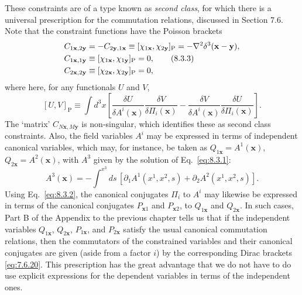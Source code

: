 These constraints are of a type known as \textit{second class}, for which
there is a universal prescription for the commutation relations, discussed
in Section 7.6. Note that the constraint functions have the Poisson brackets
\begin{align}
  C_{1\mathbf x,2\mathbf y}
  &=-C_{2\mathbf y,1\mathbf x}
  \equiv[\chi_{1\mathbf x},\chi_{2\mathbf y}]_{\mathrm P}
  =-\nabla^2\delta^3(\mathbf x-\mathbf y),
  \notag\\
  C_{1\mathbf x,1\mathbf y}
  &\equiv[\chi_{1\mathbf x},\chi_{1\mathbf y}]_{\mathrm P}=0,
  \tag{8.3.3}\label{eq:8.3.3}\\
  C_{2\mathbf x,2\mathbf y}
  &\equiv[\chi_{2\mathbf x},\chi_{2\mathbf y}]_{\mathrm P}=0,
  \notag
\end{align}
where here, for any functionals $U$ and $V$,
\[
  [U,V]_{\mathrm P}\equiv\int d^3x\left[
  \frac{\delta U}{\delta A^i(\mathbf x)}
  \frac{\delta V}{\delta\Pi_i(\mathbf x)}
  -\frac{\delta V}{\delta A^i(\mathbf x)}
  \frac{\delta U}{\delta\Pi_i(\mathbf x)}\right].
\]
The `matrix' $C_{N\mathbf x,M\mathbf y}$ is non-singular, which identifies
these as second class constraints. Also, the field variables $A^i$ may be
expressed in terms of independent canonical variables, which may, for
instance, be taken as $Q_{1\mathbf x}=A^1(\mathbf x)$,
$Q_{2\mathbf x}=A^2(\mathbf x)$, with $A^3$ given by the solution of
Eq.~\eqref{eq:8.3.1}:
\[
  A^3(\mathbf x)=-\int^{x^3}ds\,
  [\partial_1A^1(x^1,x^2,s)+\partial_2A^2(x^1,x^2,s)].
\]
Using Eq.~\eqref{eq:8.3.2}, the canonical conjugates $\Pi_i$ to $A^i$ may likewise be
expressed in terms of the canonical conjugates $P_{\mathbf x1}$ and
$P_{\mathbf x2}$, to $Q_{1\mathbf x}$ and $Q_{2\mathbf x}$. In such cases,
Part B of the Appendix to the previous chapter tells us that if the
independent variables $Q_{1\mathbf x}$, $Q_{2\mathbf x}$,
$P_{1\mathbf x}$, and $P_{2\mathbf x}$ satisfy the usual canonical
commutation relations, then the commutators of the constrained variables
and their canonical conjugates are given (aside from a factor $i$) by the
corresponding Dirac brackets \eqref{eq:7.6.20}. This prescription has the great
advantage that we do not have to do use explicit expressions for the dependent
variables in terms of the independent ones.

